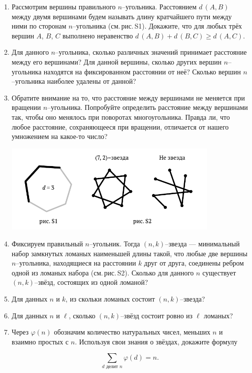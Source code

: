 ﻿
\begin{enumerate}

\item Рассмотрим вершины правильного $n$--угольника. Расстоянием $d\,(A,B)$ между двумя вершинами будем называть длину кратчайшего пути между ними по сторонам $n$--угольника (см.\,рис.\,S1). Докажите, что для любых трёх вершин $A$, $B$, $C$ выполнено неравенство $d\,(A,B) + d\,(B,C) \geq d\,(A,C)$.

\item Для данного $n$--угольника, сколько различных значений принимает расстояние между его вершинами? Для данной вершины, сколько других вершин $n$--угольника находятся на фиксированном расстоянии от неё? Сколько вершин $n$--угольника наиболее удалены от данной?

\item Обратите внимание на то, что расстояние между вершинами не меняется при вращении $n$--угольника. Попробуйте определить расстояние между вершинами так, чтобы оно менялось при поворотах многоугольника. Правда ли, что любое расстояние, сохраняющееся при вращении, отличается от нашего умножением на какое-то число?


\vspace{-0.6cm}
\begin{center}
\includegraphics[width=10.5cm]{stats/2017/images/star_defs.pdf}
\end{center} \vspace{-0.7cm}

\item Фиксируем правильный $n$--угольник. Тогда $(n,k)$--звезда — минимальный набор замкнутых ломаных наименьшей длины такой, что любые две вершины $n$--угольника, находящиеся на расстоянии $k$ друг от друга, соединены ребром одной из ломаных набора (см.\,рис.\,S2). Сколько для данного $n$ существует $(n,k)$--звёзд, состоящих из одной ломаной?

\item Для данных $n$ и $k$, из скольки ломаных состоит $(n,k)$--звезда?

\item Для данных $n$ и $\ell$, сколько $(n,k)$--звёзд состоит ровно из $\ell$ ломаных?

\item Через $\varphi(n)$ обозначим количество натуральных чисел, меньших $n$ и взаимно простых с $n$. Используя свои знания о звёздах, докажите формулу

$$\sum\limits_{d \text{ делит } n}\!\!\!\!\!\varphi(d) = n.$$
\end{enumerate}